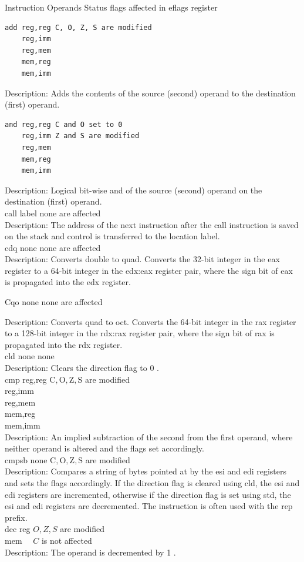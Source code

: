 \documentclass[10pt]{book}
\begin{document}
Instruction Operands Status flags affected in eflags register
\begin{verbatim}
add reg,reg C, O, Z, S are modified
    reg,imm
    reg,mem
    mem,reg
    mem,imm
\end{verbatim}

Description: Adds the contents of the source (second) operand to the destination (first) operand.

\begin{verbatim}
and reg,reg C and O set to 0
    reg,imm Z and S are modified
    reg,mem
    mem,reg
    mem,imm
\end{verbatim}

Description: Logical bit-wise and of the source (second) operand on the destination (first) operand.\\
call label none are affected\\
Description: The address of the next instruction after the call instruction is saved on the stack and control is transferred to the location label.\\
cdq none none are affected\\
Description: Converts double to quad. Converts the 32-bit integer in the eax register to a 64-bit integer in the edx:eax register pair, where the sign bit of eax is propagated into the edx register.

Cqo none none are affected

Description: Converts quad to oct. Converts the 64-bit integer in the rax register to a 128-bit integer in the rdx:rax register pair, where the sign bit of rax is propagated into the rdx register.\\
cld none none\\
Description: Clears the direction flag to 0 .\\
cmp reg,reg $\mathrm{C}, \mathrm{O}, \mathrm{Z}, \mathrm{S}$ are modified\\
reg,imm\\
reg,mem\\
mem,reg\\
mem,imm\\
Description: An implied subtraction of the second from the first operand, where neither operand is altered and the flags set accordingly.\\
cmpsb none $\mathrm{C}, \mathrm{O}, \mathrm{Z}, \mathrm{S}$ are modified\\
Description: Compares a string of bytes pointed at by the esi and edi registers and sets the flags accordingly. If the direction flag is cleared using cld, the esi and edi registers are incremented, otherwise if the direction flag is set using std, the esi and edi registers are decremented. The instruction is often used with the rep prefix.\\
dec reg $O, Z, S$ are modified\\
mem $\quad C$ is not affected\\
Description: The operand is decremented by 1 .
\end{document}
